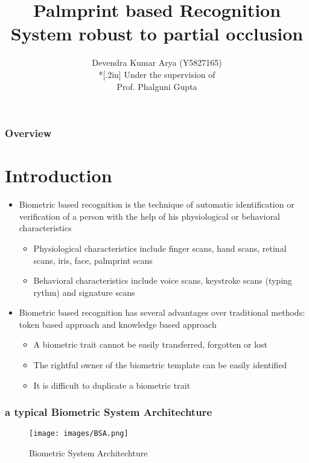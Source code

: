 \documentclass{beamer}
\title[Palmprint based Recognition System]{Palmprint based Recognition System robust to partial occlusion}
\author[Devendra Kumar Arya]{Devendra Kumar Arya (Y5827165) \\*[.2in] Under the supervision of \\ Prof. Phalguni Gupta}
\institute[IITK]{Computer Science and Engineering \\Indian Institute of Technology, Kanpur}
\begin{document}
\begin{frame}
  \titlepage
\end{frame}


\begin{frame}
  \frametitle{Overview}
  \tableofcontents
\end{frame}
\setcounter{tocdepth}{2}
\section{Introduction}
\begin{frame}
\begin{itemize}
    \item Biometric based recognition is the technique of automatic identification or verification of a person with the help of his physiological or behavioral characteristics
    \begin{itemize}
	\item Physiological characteristics include finger scans, hand scans, retinal scans, iris, face, palmprint scans
	\item Behavioral characteristics include voice scans, keystroke scans (typing rythm) and signature scans
    \end{itemize}
    \item Biometric based recognition has several advantages over traditional methods: token based approach and knowledge based approach
    \begin{itemize}
	\item A biometric trait cannot be easily transferred, forgotten or lost
	\item The rightful owner of the biometric template can be easily identified
	\item It is difficult to duplicate a biometric trait
    \end{itemize}
\end{itemize}
\end{frame}

\begin{frame}
  \frametitle{a typical Biometric System Architechture}
	\begin{figure}
	\begin{center}
	\texttt{[image: images/BSA.png]}
	\caption{Biometric System Architechture}
	\label{fig:bsa}
	\end{center}
	\end{figure}
\end{frame}
\end{document}
